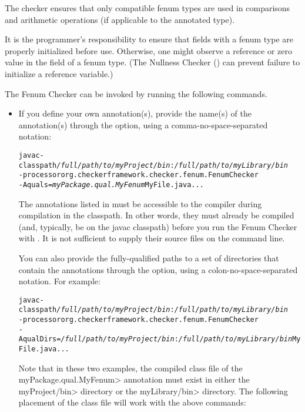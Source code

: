 The checker ensures that
only compatible fenum types are used in comparisons and arithmetic operations
(if applicable to the annotated type).

It is the programmer's responsibility to ensure that fields with a fenum type
are properly initialized before use.  Otherwise, one might observe a 
reference or zero value in the field of a fenum type.  (The Nullness Checker
() can prevent failure to initialize a
reference variable.)



The Fenum Checker can be invoked by running the following commands.

\begin{itemize}
  \item
If you define your own annotation(s), provide the name(s) of the annotation(s)
through the  option, using a comma-no-space-separated notation:

\begin{alltt}
  javac -classpath \textit{/full/path/to/myProject/bin}:\textit{/full/path/to/myLibrary/bin} \ttbs
        -processor org.checkerframework.checker.fenum.FenumChecker \ttbs
        -Aquals=\textit{myPackage.qual.MyFenum} MyFile.java ...
\end{alltt}

The annotations listed in  must be accessible to
the compiler during compilation in the classpath.  In other words, they must
already be compiled (and, typically, be on the javac classpath)
before you run the Fenum Checker with .  It
is not sufficient to supply their source files on the command line.

You can also provide the fully-qualified paths to a set of directories
that contain the annotations through the  option,
using a colon-no-space-separated notation. For example:

\begin{alltt}
  javac -classpath \textit{/full/path/to/myProject/bin}:\textit{/full/path/to/myLibrary/bin} \ttbs
        -processor org.checkerframework.checker.fenum.FenumChecker \ttbs
        -AqualDirs=\textit{/full/path/to/myProject/bin}:\textit{/full/path/to/myLibrary/bin} MyFile.java ...
\end{alltt}

Note that in these two examples, the compiled class file of the
\<myPackage.qual.MyFenum> annotation must exist in either the \<myProject/bin>
directory or the \<myLibrary/bin> directory. The following placement of
the class file will work with the above commands:


\end{itemize}
